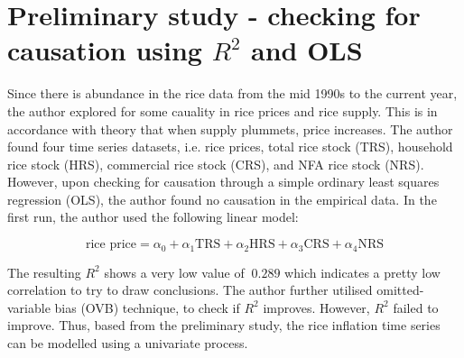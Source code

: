 \setcounter{page}{1} %

\section{Preliminary study - checking for causation using $R^2$ and OLS} %

Since there is abundance in the rice data from the mid 1990s to the current year, the author explored for some cauality in rice prices and rice supply. This is in accordance with theory that when supply plummets, price increases. The author found four time series datasets, i.e. rice prices, total rice stock (TRS), household rice stock (HRS), commercial rice stock (CRS), and NFA rice stock (NRS). However, upon checking for causation through a simple ordinary least squares regression (OLS), the author found no causation in the empirical data. In the first run, the author used the following linear model:

\begin{equation}
	\text{rice price} = \alpha_0 + \alpha_1 \text{TRS} + \alpha_2 \text{HRS} + \alpha_3 \text{CRS} + \alpha_4 \text{NRS} 
\end{equation}

The resulting $R^2$ shows a very low value of $~0.289$ which indicates a pretty low correlation to try to draw conclusions. The author further utilised omitted-variable bias (OVB) technique, to check if $R^2$ improves. However, $R^2$ failed to improve. Thus, based from the preliminary study, the rice inflation time series can be modelled using a univariate process.